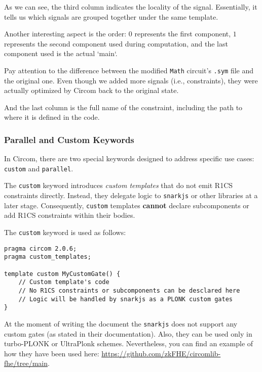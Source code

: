 \documentclass[../lecture-notes-105x135.tex]{subfiles}
\begin{document}
    As we can see, the third column indicates the locality of the signal.
    Essentially, it tells us which signals are grouped together under the same template.

    Another interesting aspect is the order: $0$ represents the first component, $1$ represents the second component used during computation, and the last component used is the actual `main`.

    \begin{remark}
        Pay attention to the difference between the modified \texttt{Math} circuit's \texttt{.sym} file and the original one.
        Even though we added more signals (i.e., constraints), they were actually optimized by Circom back to the original state.
    \end{remark}

    And the last column is the full name of the constraint, including the path to where it is defined in the code.

    \subsubsection{Parallel and Custom Keywords}

    In Circom, there are two special keywords designed to address specific use cases: \texttt{custom} and \texttt{parallel}.

    The \texttt{custom} keyword introduces \emph{custom templates} that do not emit R1CS constraints directly.
    Instead, they delegate logic to \texttt{snarkjs} or other libraries at a later stage.
    Consequently, \texttt{custom} templates \textbf{cannot} declare subcomponents or add R1CS constraints within their bodies.

    The \texttt{custom} keyword is used as follows:

    \begin{lstlisting}[language=Circom,basicstyle=\ttfamily\footnotesize]
pragma circom 2.0.6;
pragma custom_templates;

template custom MyCustomGate() {
    // Custom template's code
    // No R1CS constraints or subcomponents can be desclared here
    // Logic will be handled by snarkjs as a PLONK custom gates
}
    \end{lstlisting}

    \begin{remark}
        At the moment of writing the document the \texttt{snarkjs} does not support any custom gates (as stated in their documentation).
        Also, they can be used only in turbo-PLONK or UltraPlonk schemes.
        Nevertheless, you can find an example of how they have been used here: \url{https://github.com/zkFHE/circomlib-fhe/tree/main}.
    \end{remark}
\end{document}
